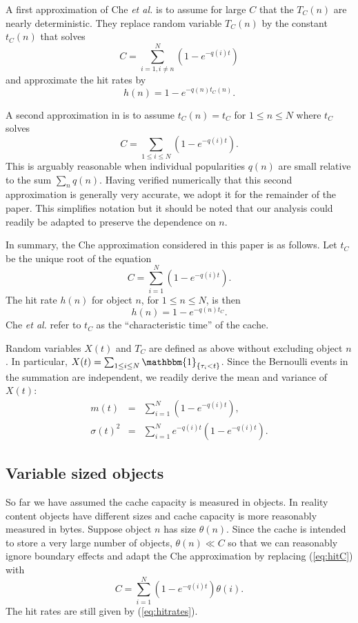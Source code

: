 \documentclass{amsart}
\def\etal{{\em et al. }}
\newcommand\ind[1]{\mathbbm{1}_{\left\{#1\right\}}}
\begin{document}
A first approximation of Che \etal \cite{CTW02} is to assume for large $C$ that the $T_C(n)$ are nearly deterministic. They replace random variable $T_C(n)$ by the constant $t_C(n)$ that solves
\begin{equation*}
C=\sum_{i=1,i\ne n}^{N}\left(1-e^{-q(i)t}\right)
\end{equation*}
and approximate the hit rates by
$$h(n)=1-e^{-q(n) t_C(n)}.$$

A second approximation in \cite{CTW02} is to assume  $t_C(n)=t_C$ for $1 \le n \le N$ where $t_C$ solves $$C=\sum_{1\le i \le N}(1-e^{-q(i)t}).$$ This is arguably reasonable when individual popularities $q(n)$ are small relative to the sum $\sum_n q(n)$. Having verified numerically that this second approximation is generally very accurate, we adopt it for the remainder of the paper. This simplifies notation but it should be noted that our analysis could readily be adapted to preserve the dependence on $n$.

In summary, the Che approximation considered in this paper is as follows. Let $t_C$  be the unique root of the equation
\begin{equation}
\label{eq:hitC}
C=\sum_{i=1}^{N}\left(1-e^{-q(i)t}\right).
\end{equation}
The hit rate $h(n)$ for object $n$, for $1 \le n \le N$, is then 
\begin{equation}
\label{eq:hitrates}
h(n) =1-e^{-q(n)t_C}.
\end{equation}
Che \etal  refer to $t_C$ as the ``characteristic time'' of the cache.



Random variables $X(t)$ and $T_C$ are defined as above without excluding object $n$. In particular, $X(t) = \sum_{1\le i \le N} \ind{\tau_i<t}$. Since the Bernoulli events in the summation are independent, we readily derive the mean and variance of $X(t)$:
\begin{eqnarray}
m(t)&=&\sum_{i=1}^N (1-e^{-q(i)t}), \label{eq:m(t)} \\
\sigma(t)^2&=&\sum_{i=1}^N e^{-q(i)t} (1-e^{-q(i)t}). \label{eq:sigma2(t)}
\end{eqnarray}



 \subsection{Variable sized objects}
 \label{sec:varsize}
 
So far we have assumed the cache capacity is measured in objects. In reality content objects have different sizes and cache capacity is more reasonably measured in bytes. Suppose object $n$ has size $\theta(n)$. Since the cache is intended to store a very large number of objects, $\theta(n)\ll C$ so that we can reasonably ignore boundary effects and adapt the Che approximation by replacing (\ref{eq:hitC}) with
\begin{equation}
\label{eq:hitCvar}
C=\sum_{i=1}^{N}\left(1-e^{-q(i)t}\right)\theta(i).
\end{equation}
The hit rates are still given by (\ref{eq:hitrates}).
\end{document}
